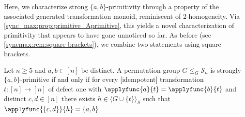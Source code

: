 
Here, we characterize strong $\{a,b\}$-primitivity through a property of the associated generated transformation monoid, reminiscent of $2$-homogeneity.  
Via \cref{sync_max:prop:primitive_Aprimitive}, this yields a novel characterization of primitivity that appears to have gone unnoticed so far.  
As before (see \cref{syncmax:rem:square-brackets}), we combine two statements using square brackets.

 \begin{theorem}
 \label{sync_max:thm:2-hom}
 	Let $n \ge 5$ and $a,b \in [n]$ be distinct.
 	A permutation group $G \le_G \mathcal S_n$
 	is strongly $\{a,b\}$-primitive 
 	if and only if for every [idempotent]
    transformation $t \colon [n] \to [n]$
    of defect one with $\applyfunc{a}{t} = \applyfunc{b}{t}$
    and distinct $c,d \in [n]$
    there exists $h \in \langle G \cup \{t\} \rangle_S$
    such that $\applyfunc{\{c,d\}}{h} = \{a,b\}$. 
 \end{theorem}
